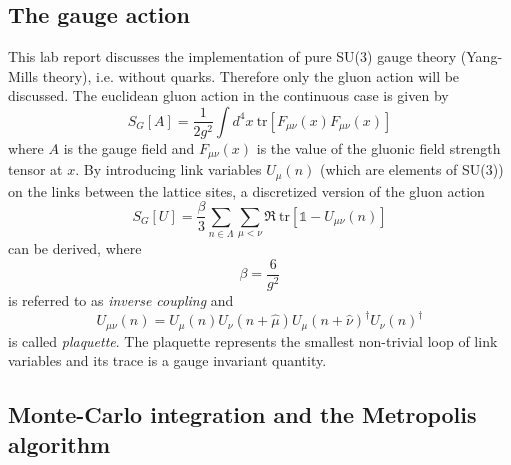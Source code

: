 \documentclass[graybox]{svmult}
\begin{document}
\subsection{The gauge action}

This lab report discusses the implementation of pure SU(3) gauge theory (Yang-Mills theory), i.e. without quarks. Therefore only the gluon action will be discussed.
The euclidean gluon action in the continuous case is given by
\begin{equation}
S_G[A] = \frac 1 {2g^2} \int d^4x \ \text{tr}[F_{\mu \nu}(x) F_{\mu \nu}(x)]
\end{equation}
where $A$ is the gauge field and $F_{\mu \nu}(x)$ is the value of the gluonic field strength tensor at $x$. By introducing link variables $U_{\mu}(n)$ (which are elements of SU(3)) on the links between the lattice sites, a discretized version of the gluon action
\begin{equation}
\label{eq:plaq}
S_G[U] = \frac {\beta} 3 \sum_{n \in \Lambda} \sum_{\mu < \nu} \Re\ \text{tr} [\mathbb{1} - U_{\mu \nu}(n)]
\end{equation}
can be derived, where
\begin{equation}
\beta = \frac 6 {g^2}
\end{equation}
is referred to as \emph{inverse coupling} and 
\begin{equation}
U_{\mu \nu}(n) = U_{\mu}(n) U_{\nu}(n+\hat{\mu}) U_{\mu}(n+\hat{\nu})^{\dagger} U_{\nu}(n)^{\dagger}
\end{equation}
is called \emph{plaquette}. The plaquette represents the smallest non-trivial loop of link variables and its trace is a gauge invariant quantity.



\subsection{Monte-Carlo integration and the Metropolis algorithm}
\end{document}
